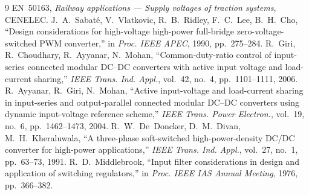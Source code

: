 \documentclass[10pt,a4paper]{scrartcl}
\begin{document}
\begin{onehalfspace}
{\small
\begin{thebibliography}{9}
 EN~50163, \emph{Railway applications --- Supply voltages of traction systems}, CENELEC.
 J.~A.~Sabaté, V.~Vlatkovic, R.~B.~Ridley, F.~C.~Lee, B.~H.~Cho, ``Design considerations for high-voltage high-power full-bridge zero-voltage-switched PWM converter,'' in \emph{Proc. IEEE APEC}, 1990, pp.~275--284.
 R.~Giri, R.~Choudhary, R.~Ayyanar, N.~Mohan, ``Common-duty-ratio control of input-series connected modular DC--DC converters with active input voltage and load-current sharing,'' \emph{IEEE Trans. Ind. Appl.}, vol.~42, no.~4, pp.~1101--1111, 2006.
 R.~Ayyanar, R.~Giri, N.~Mohan, ``Active input-voltage and load-current sharing in input-series and output-parallel connected modular DC--DC converters using dynamic input-voltage reference scheme,'' \emph{IEEE Trans. Power Electron.}, vol.~19, no.~6, pp.~1462--1473, 2004.
 R.~W.~De~Doncker, D.~M.~Divan, M.~H.~Kheraluwala, ``A three-phase soft-switched high-power-density DC/DC converter for high-power applications,'' \emph{IEEE Trans. Ind. Appl.}, vol.~27, no.~1, pp.~63--73, 1991.
 R.~D.~Middlebrook, ``Input filter considerations in design and application of switching regulators,'' in \emph{Proc. IEEE IAS Annual Meeting}, 1976, pp.~366--382.
\end{thebibliography}
}

\end{onehalfspace}
\end{document}
